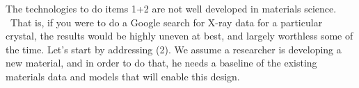 The technologies to do items 1+2 are not well developed in materials science.  That is, if you were to do a Google search for X-ray data for a particular crystal, the results would be highly uneven at best, and largely worthless some of the time.  Let’s start by addressing (2).  We assume a researcher is developing a new material, and in order to do that, he needs a baseline of the existing materials data and models that will enable this design.  

